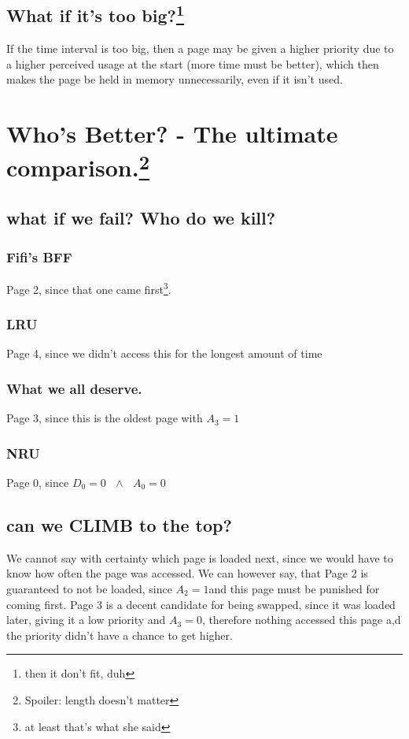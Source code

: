 \documentclass[a4paper, 11pt]{article}
\begin{document}
      \newpage
      \subsection[What if it's too big?]{What if it's too big?\footnote{then it don't fit, duh}}
      If the time interval is too big, then a page may be given a higher priority due to a higher perceived usage at the start (more time must be better), which then makes the page be held in memory unnecessarily, even if it isn't used.

      \section[Who's Better? - The ultimate comparison.]{Who's Better? - The ultimate comparison.\footnote{Spoiler: length doesn't matter}}
      \subsection{what if we fail? Who do we kill?}
      \subsubsection{Fifi's BFF}
      Page 2, since that one came first\footnote{at least that's what she said}.
      \subsubsection{LRU}
      Page 4, since we didn't access this for the longest amount of time
      \subsubsection{What we all deserve.}
      Page 3, since this is the oldest page with $A_3=1$
      \subsubsection{NRU}
      Page 0, since $D_0=0 \mbox{ } \land \mbox{ } A_0=0$

      \subsection{can we CLIMB to the top?}
      We cannot say with certainty which page is loaded next, since we would have to know how often the page was accessed. 
      We can however say, that Page 2 is guaranteed to not be loaded, since $A_2=1$and this page must be punished for coming first.
      Page 3 is a decent candidate for being swapped, since it was loaded later, giving it a low priority and $A_3=0$, 
      therefore nothing accessed this page a,d the priority didn't have a chance to get higher.
      \newpage
\end{document}
